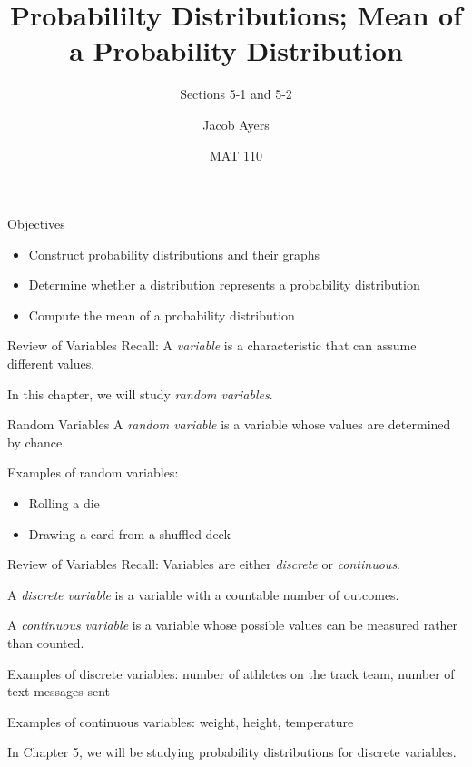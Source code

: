 \documentclass[t, aspectratio=169]{beamer}
\title[5-1]{Probabililty Distributions; Mean of a Probability Distribution}
\subtitle{Sections 5-1 and 5-2}
\author{Jacob Ayers}
\institute{Lesson \#14}
\date{MAT 110}
\newcommand{\?}{\stackrel{?}{=}}
\begin{document}
	
	\begin{frame}
		\titlepage
	\end{frame}
	
	\begin{frame}{Objectives}
		\begin{itemize}
			\item Construct probability distributions and their graphs
			\item Determine whether a distribution represents a probability distribution
			\item Compute the mean of a probability distribution
		\end{itemize}
	\end{frame}

	\begin{frame}{Review of Variables}
		Recall: A \textit{variable} is a characteristic that can assume different values. \pause
		
		In this chapter, we will study \textit{random variables}.
		
		\begin{block}{Random Variables}
			A \textit{random variable} is a variable whose values are determined by chance.
		\end{block} \pause
	
		Examples of random variables: \begin{itemize}
			\item Rolling a die
			\item Drawing a card from a shuffled deck
		\end{itemize}
	\end{frame}

	\begin{frame}{Review of Variables}
		Recall: Variables are either \textit{discrete} or \textit{continuous}. \pause
		
		A \textit{discrete variable} is a variable with a countable number of outcomes. \pause
		
		A \textit{continuous variable} is a variable whose possible values can be measured rather than counted. \pause
		
		Examples of discrete variables: number of athletes on the track team, number of text messages sent \pause
		
		Examples of continuous variables: weight, height, temperature \pause
		
		In Chapter 5, we will be studying probability distributions for discrete variables.
	\end{frame}
\end{document}

